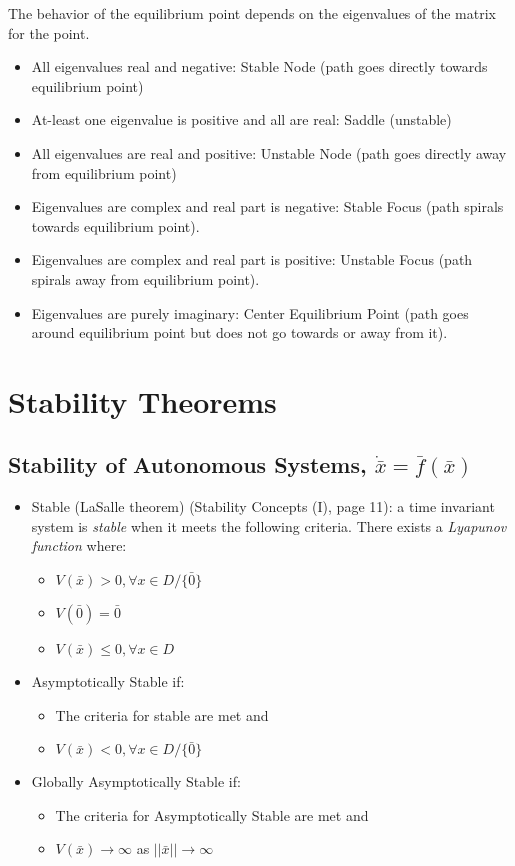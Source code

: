 \documentclass[12pt]{article}
\begin{document}
The behavior of the equilibrium point depends on the eigenvalues of the matrix for the point. 

\begin{itemize}
	\item All eigenvalues real and negative: Stable Node (path goes directly towards equilibrium point)
	\item At-least one eigenvalue is positive and all are real: Saddle (unstable)
	\item All eigenvalues are real and positive: Unstable Node (path goes directly away from equilibrium point)
	\item Eigenvalues are complex and real part is negative: Stable Focus (path spirals towards equilibrium point).
	\item Eigenvalues are complex and real part is positive: Unstable Focus (path spirals away from equilibrium point).
	\item Eigenvalues are purely imaginary: Center Equilibrium Point (path goes around equilibrium point but does not go towards or away from it).
\end{itemize}

\newpage
\section*{Stability Theorems}
\subsection*{Stability of Autonomous Systems, $\dot{\bar{x}}=\bar{f}(\bar{x})$}
\begin{itemize}
\item Stable (LaSalle theorem) (Stability Concepts (I), page 11): a time invariant system is {\em stable} when it meets the following criteria. There exists a {\em Lyapunov function} where:
	\begin{itemize}
	\item $V(\bar{x})>0, \forall x \in D/\{\bar{0}\}$
	\item $V(\bar{0})=\bar{0}$
	\item $V(\bar{x})\leq0, \forall x \in D$
	\end{itemize}
\item Asymptotically Stable if:
	\begin{itemize}
	\item The criteria for stable are met and
	\item $V(\bar{x})<0, \forall x \in D/\{\bar{0}\}$
	\end{itemize}
\item Globally Asymptotically Stable if:
	\begin{itemize}
	\item The criteria for Asymptotically Stable are met and
	\item $V(\bar{x})\to\infty$ as $||\bar{x}||\to\infty$
	\end{itemize}
\end{itemize}
\end{document}
